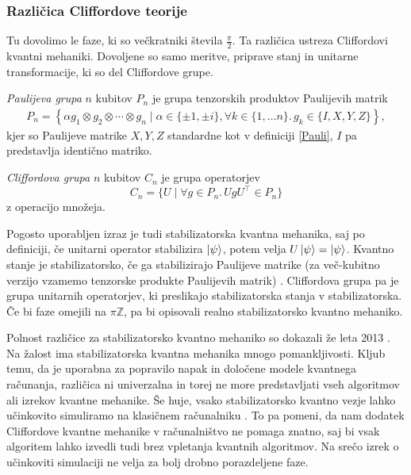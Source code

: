 \documentclass[mat1]{fmfdelo}
\newcommand{\Z}{\mathbb Z}
\newcommand{\tranp}{\top}
\newcommand{\sep}{\ensuremath{.\,}}
\begin{document}
\subsubsection{Različica Cliffordove teorije}
Tu dovolimo le faze, ki so večkratniki števila \(\frac\pi2\). Ta različica ustreza Cliffordovi kvantni mehaniki. Dovoljene so samo meritve, priprave stanj in unitarne transformacije, ki so del Cliffordove grupe.
\begin{definicija}
    \emph{Paulijeva grupa} \(n\) kubitov \(P_n\) je grupa tenzorskih produktov Paulijevih matrik
    \begin{align*}
        P_n = \left\{\alpha g_1\otimes g_2\otimes\cdots\otimes g_n \mid \alpha\in\{\pm 1, \pm i\}, \forall k\in\{1,\ldots n\}\sep g_k\in \{I,X,Y,Z\}\right\},
    \end{align*}
    kjer so Paulijeve matrike \(X,Y,Z\) standardne kot v definiciji \ref{Pauli}, \(I\) pa predstavlja identično matriko.
\end{definicija}
\begin{definicija}
    \emph{Cliffordova grupa} \(n\) kubitov \(C_n\) je grupa operatorjev \[C_n=\{U\mid \forall g\in P_n\sep UgU^\tranp\in P_n\}\] z operacijo množeja.
\end{definicija}
Pogosto uporabljen izraz je tudi stabilizatorska kvantna mehanika, saj po definiciji, če unitarni operator stabilizira \(\ket \psi\), potem velja \(U\ket\psi = \ket\psi\). Kvantno stanje je stabilizatorsko, če ga stabilizirajo Paulijeve matrike (za več-kubitno verzijo vzamemo tenzorske produkte Paulijevih matrik) \cite{Backens1}. Cliffordova grupa pa je grupa unitarnih operatorjev, ki preslikajo stabilizatorska stanja v stabilizatorska. Če bi faze omejili na \(\pi\Z\), pa bi opisovali realno stabilizatorsko kvantno mehaniko.

Polnost različice za stabilizatorsko kvantno mehaniko so dokazali že leta 2013 \cite{Backens1}. Na žalost ima stabilizatorska kvantna mehanika mnogo pomankljivosti. Kljub temu, da je uporabna za popravilo napak in določene modele kvantnega računanja, različica ni univerzalna in torej ne more predstavljati vseh algoritmov ali izrekov kvantne mehanike. Še huje, vsako stabilizatorsko kvantno vezje lahko učinkovito simuliramo na klasičnem računalniku \cite{Aaronson_2004}. To pa pomeni, da nam dodatek Cliffordove kvantne mehanike v računalništvo ne pomaga znatno, saj bi vsak algoritem lahko izvedli tudi brez vpletanja kvantnih algoritmov. Na srečo izrek o učinkoviti simulaciji ne velja za bolj drobno porazdeljene faze.
\end{document}
